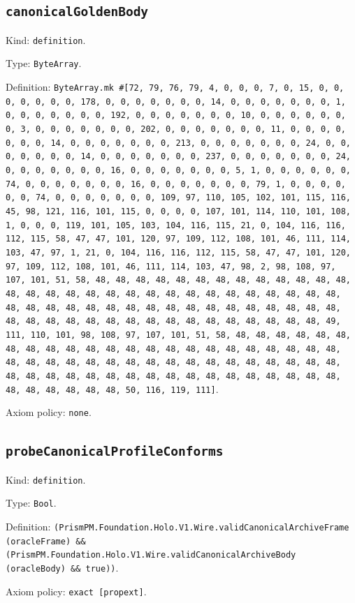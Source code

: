 \documentclass[11pt]{article}
\begin{document}
\subsection*{\texttt{canonicalGoldenBody}}
\noindent Kind: \texttt{definition}.\par
\noindent Type: \texttt{ByteArray}.\par
\noindent Definition: \texttt{ByteArray.mk \#[72, 79, 76, 79, 4, 0, 0, 0, 7, 0, 15, 0, 0, 0, 0, 0, 0, 0, 178, 0, 0, 0, 0, 0, 0, 0, 14, 0, 0, 0, 0, 0, 0, 0, 1, 0, 0, 0, 0, 0, 0, 0, 192, 0, 0, 0, 0, 0, 0, 0, 10, 0, 0, 0, 0, 0, 0, 0, 3, 0, 0, 0, 0, 0, 0, 0, 202, 0, 0, 0, 0, 0, 0, 0, 11, 0, 0, 0, 0, 0, 0, 0, 14, 0, 0, 0, 0, 0, 0, 0, 213, 0, 0, 0, 0, 0, 0, 0, 24, 0, 0, 0, 0, 0, 0, 0, 14, 0, 0, 0, 0, 0, 0, 0, 237, 0, 0, 0, 0, 0, 0, 0, 24, 0, 0, 0, 0, 0, 0, 0, 16, 0, 0, 0, 0, 0, 0, 0, 5, 1, 0, 0, 0, 0, 0, 0, 74, 0, 0, 0, 0, 0, 0, 0, 16, 0, 0, 0, 0, 0, 0, 0, 79, 1, 0, 0, 0, 0, 0, 0, 74, 0, 0, 0, 0, 0, 0, 0, 109, 97, 110, 105, 102, 101, 115, 116, 45, 98, 121, 116, 101, 115, 0, 0, 0, 0, 107, 101, 114, 110, 101, 108, 1, 0, 0, 0, 119, 101, 105, 103, 104, 116, 115, 21, 0, 104, 116, 116, 112, 115, 58, 47, 47, 101, 120, 97, 109, 112, 108, 101, 46, 111, 114, 103, 47, 97, 1, 21, 0, 104, 116, 116, 112, 115, 58, 47, 47, 101, 120, 97, 109, 112, 108, 101, 46, 111, 114, 103, 47, 98, 2, 98, 108, 97, 107, 101, 51, 58, 48, 48, 48, 48, 48, 48, 48, 48, 48, 48, 48, 48, 48, 48, 48, 48, 48, 48, 48, 48, 48, 48, 48, 48, 48, 48, 48, 48, 48, 48, 48, 48, 48, 48, 48, 48, 48, 48, 48, 48, 48, 48, 48, 48, 48, 48, 48, 48, 48, 48, 48, 48, 48, 48, 48, 48, 48, 48, 48, 48, 48, 48, 48, 49, 111, 110, 101, 98, 108, 97, 107, 101, 51, 58, 48, 48, 48, 48, 48, 48, 48, 48, 48, 48, 48, 48, 48, 48, 48, 48, 48, 48, 48, 48, 48, 48, 48, 48, 48, 48, 48, 48, 48, 48, 48, 48, 48, 48, 48, 48, 48, 48, 48, 48, 48, 48, 48, 48, 48, 48, 48, 48, 48, 48, 48, 48, 48, 48, 48, 48, 48, 48, 48, 48, 48, 48, 48, 50, 116, 119, 111]}.\par
\noindent Axiom policy: \texttt{none}.\par
\subsection*{\texttt{probeCanonicalProfileConforms}}
\noindent Kind: \texttt{definition}.\par
\noindent Type: \texttt{Bool}.\par
\noindent Definition: \texttt{(PrismPM.Foundation.Holo.V1.Wire.validCanonicalArchiveFrame (oracleFrame) \&\& (PrismPM.Foundation.Holo.V1.Wire.validCanonicalArchiveBody (oracleBody) \&\& true))}.\par
\noindent Axiom policy: \texttt{exact [propext]}.\par
\end{document}
